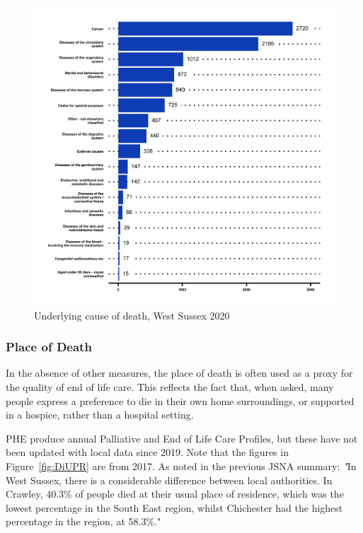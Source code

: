 \begin{figure}
    \caption{Underlying cause of death, West Sussex 2020}\label{fig:underlying-cod}
    \centering
    \includegraphics[width=\linewidth]{images/underlying_cause_of_death.png}
\end{figure}

\subsubsection{Place of Death}

 In the absence of other measures, the place of death is often used as a proxy for the quality of end of life care. This reflects the fact that, when asked, many people express a preference to die in their own home surroundings, or supported in a hospice, rather than a hospital setting.

 PHE produce annual Palliative and End of Life Care Profiles, but these have not been updated with local data since 2019. Note that the figures in Figure~\ref{fig:DiUPR} are from 2017. As noted in the previous  JSNA summary: {\textit "In West Sussex, there is a considerable difference between local authorities. In Crawley, 40.3\% of people died at their usual place of residence, which was the lowest percentage in the South East region, whilst Chichester had the highest percentage in the region, at 58.3\%."}

